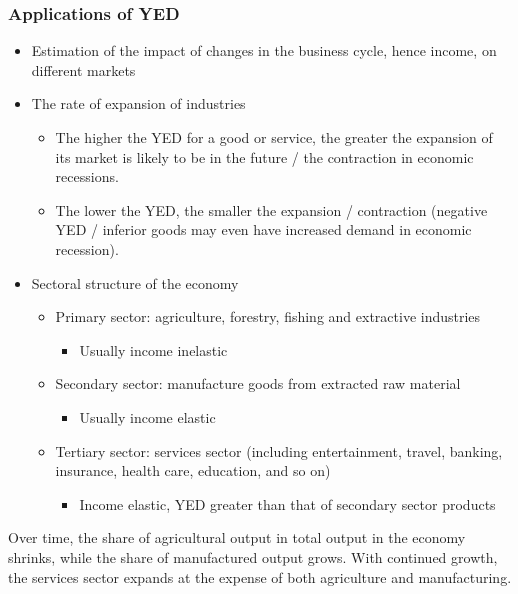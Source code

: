 \documentclass[a4paper,12pt]{article}
\begin{document}
\subsubsection*{Applications of YED}
\begin{itemize}
    \item Estimation of the impact of changes in the business cycle, hence income, on different markets
  \item The rate of expansion of industries
  \begin{itemize}
    \item The higher the YED for a good or service, the greater the expansion of its market is likely to be in the future / the contraction in economic recessions.
    \item The lower the YED, the smaller the expansion / contraction (negative YED / inferior goods may even have increased demand in economic recession).
  \end{itemize}
  \item Sectoral structure of the economy
  \begin{itemize}
      \item Primary sector: agriculture, forestry, fishing and extractive industries
      \begin{itemize}
        \item Usually income inelastic
      \end{itemize}
      \item Secondary sector: manufacture goods from extracted raw material
      \begin{itemize}
        \item Usually income elastic
      \end{itemize}
      \item Tertiary sector: services sector (including entertainment, travel, banking, insurance, health care, education, and so on)
      \begin{itemize}
        \item Income elastic, YED greater than that of secondary sector products
      \end{itemize}
  \end{itemize}
\end{itemize}
Over time, the share of agricultural output in total output in the economy shrinks, while the share of manufactured output grows. With continued growth, the services sector expands at the expense of both agriculture and manufacturing.
\end{document}
